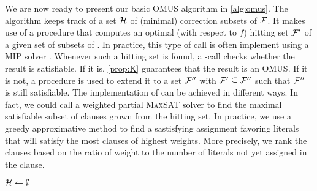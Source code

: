 We are now ready to present our basic OMUS algorithm in \cref{alg:omus}. 
The algorithm keeps track of a set $\mathcal{H}$ of (minimal) correction subsets of $\mathcal{F} $. 
It makes use of a procedure \ohs that computes an optimal (with respect to $f$) hitting set $\mathcal{F} '$  of a given set of subsets of \formula. In practice, this type of call is often implement using a MIP solver \cite{davies2011solving}. 
Whenever such a hitting set is found, a \sat-call checks whether the result is satisfiable. If it is, \cref{prop:K} guarantees that the result is an OMUS. 
If it is not, a procedure \grow is used to extend it to a set $\mathcal{F} ''$ with $\mathcal{F} '\subseteq \mathcal{F} ''$ such that $\mathcal{F} ''$ is still satisfiable.
The implementation of \grow can be achieved in different ways.
In fact, we could call a weighted partial \textsc{MaxSAT} solver to find the maximal satisfiable subset of clauses grown from the hitting set.
In practice, we use a greedy approximative method to find a sastisfying assignment favoring literals that will satisfy the most clauses of highest weights.
More precisely, we rank the clauses based on the ratio of weight to the number of literals not yet assigned in the clause.


% 

\begin{algorithm}[ht]
  \DontPrintSemicolon
  $\mathcal{H}   \gets \emptyset$ \; %
  \caption{$\omus(\formula,f)$ }
  \label{alg:omus}
\end{algorithm}


